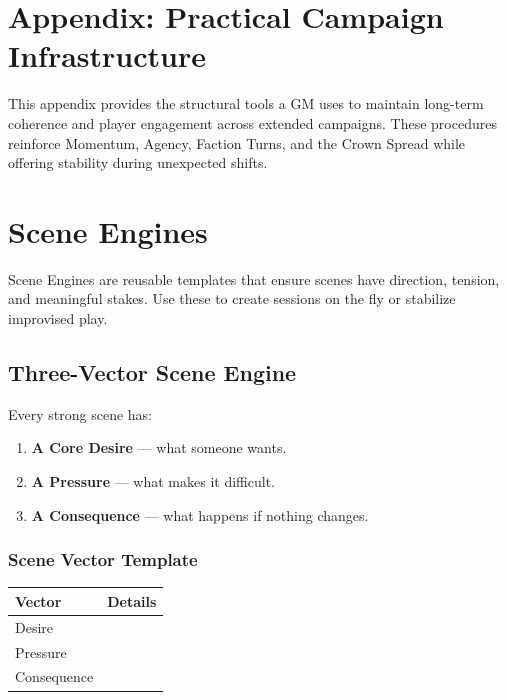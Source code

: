 \documentclass[11pt]{article}
\begin{document}
\section*{Appendix: Practical Campaign Infrastructure}

This appendix provides the structural tools a GM uses to maintain long-term coherence and 
player engagement across extended campaigns. These procedures reinforce Momentum, Agency, 
Faction Turns, and the Crown Spread while offering stability during unexpected shifts.


\section{Scene Engines}
\label{appendix:scene-engines}

Scene Engines are reusable templates that ensure scenes have direction, tension, and 
meaningful stakes. Use these to create sessions on the fly or stabilize improvised play.

\subsection{Three-Vector Scene Engine}

Every strong scene has:
\begin{enumerate}
    \item \textbf{A Core Desire} --- what someone wants.
    \item \textbf{A Pressure} --- what makes it difficult.
    \item \textbf{A Consequence} --- what happens if nothing changes.
\end{enumerate}

\subsubsection{Scene Vector Template}
\begin{center}
\begin{longtable}{|p{4cm}|p{10cm}|}
\hline
\textbf{Vector} & \textbf{Details} \\
\hline
Desire & \underline{\phantom{XXXXXXXXXXXXXXXXXXXXX}} \\
Pressure & \underline{\phantom{XXXXXXXXXXXXXXXXXXXXX}} \\
Consequence & \underline{\phantom{XXXXXXXXXXXXXXXXXXXXX}} \\
\hline
\end{longtable}
\end{center}
\end{document}
